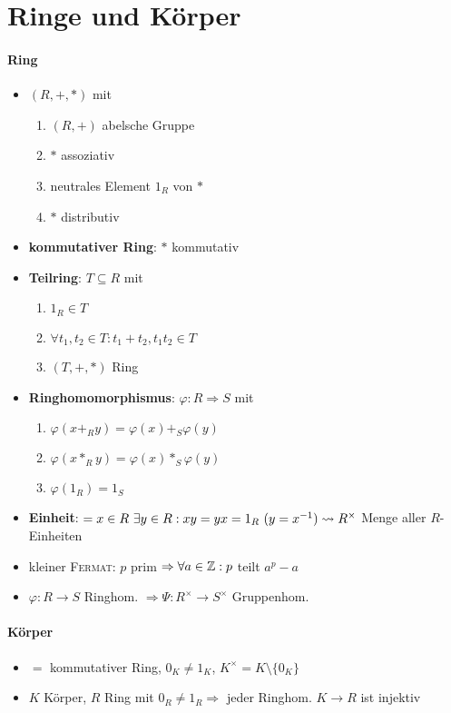 \section{\label{sec:RingeKoerper}Ringe und Körper}

\paragraph{Ring}
\begin{itemize}
  \item $(R,+,*)$ mit
  \begin{enumerate}
    \item $(R,+)$ abelsche Gruppe
    \item $*$ assoziativ
    \item neutrales Element $1_R$ von $*$
    \item $*$ distributiv
  \end{enumerate}
  \item \textbf{kommutativer Ring}: $*$ kommutativ
  \item \textbf{Teilring}: $T \subseteq R$ mit
    \begin{enumerate}
      \item $1_R \in T$
      \item $\forall  t_1, t_2 \in T: t_1+t_2, t_1t_2 \in T$
      \item $(T,+,*)$ Ring
    \end{enumerate}
  \item \textbf{Ringhomomorphismus}: $\varphi: R \Rightarrow S$ mit
  \begin{enumerate}
    \item $\varphi(x +_R y) = \varphi(x) +_S \varphi(y)$
    \item $\varphi(x *_R y) = \varphi(x) *_S \varphi(y)$
    \item $\varphi(1_R) = 1_S$
  \end{enumerate}
  \item \textbf{Einheit}: $= x \in R \ \exists y \in R: xy = yx = 1_R \ (y = x^{-1}) \\* \leadsto R^{\times}$ Menge aller $R$-Einheiten
  \item kleiner \textsc{Fermat}: $p$ prim $\Rightarrow \forall a \in \mathbb{Z}: p$ teilt $a^p-a$
  \item $\varphi: R \rightarrow S$ Ringhom. $\Rightarrow \Psi: R^{\times} \rightarrow S^{\times}$ Gruppenhom.
\end{itemize}

\paragraph{Körper}
\begin{itemize}
  \item $=$ kommutativer Ring, $0_K \neq 1_K$, $K^{\times} = K \setminus \{ 0_K\}$
  \item $K$ Körper, $R$ Ring mit $0_R \neq 1_R \Rightarrow$ jeder Ringhom. $K \rightarrow R$ ist injektiv
\end{itemize}

